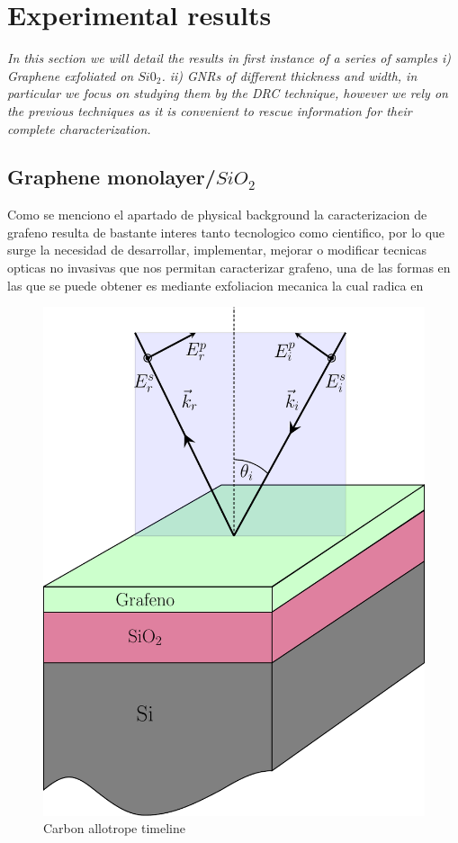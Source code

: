 \chapter{Experimental results}
\label{chap:chap3}
\textit{In this section we will detail the results in first instance of a series of samples i) Graphene exfoliated on $Si0_2$. ii) GNRs of different thickness and width, in particular we focus on studying them by the DRC technique, however we rely on the previous techniques as it is convenient to rescue information for their complete characterization. }
\vfill
\minitoc
\newpage

\allowdisplaybreaks
\section{Graphene monolayer/$SiO_2$}
\vspace{-1cm}
Como se menciono el apartado de physical background la caracterizacion de grafeno resulta de bastante interes tanto tecnologico como cientifico, por lo que surge la necesidad de desarrollar, implementar, mejorar o modificar tecnicas opticas no invasivas que nos permitan caracterizar grafeno, una de las formas en las que se puede obtener es mediante exfoliacion mecanica la cual radica en 

\begin{figure}
	\centering
	\includegraphics[width=0.45\linewidth]{FIGURES/Experimental_results/Sample.pdf}
	\caption{Carbon allotrope timeline}
	\label{fig:introfig32}
\end{figure}


